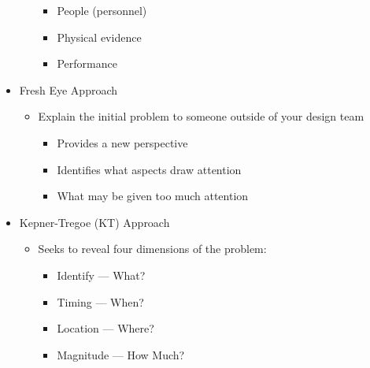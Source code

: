 \begin{itemize}
\begin{itemize}
\begin{itemize}
          \item People (personnel)

          \item Physical evidence

          \item Performance
            
        \end{itemize}

    \end{itemize}

  \item Fresh Eye Approach

    \begin{itemize}

      \item Explain the initial problem to someone outside of your design team

        \begin{itemize}

          \item Provides a new perspective

          \item Identifies what aspects draw attention

          \item What may be given too much attention

        \end{itemize}
        
    \end{itemize}

  \item Kepner-Tregoe (KT) Approach

    \begin{itemize}

      \item Seeks to reveal four dimensions of the problem:

        \begin{itemize}

          \item Identify — What?

          \item Timing — When?

          \item Location — Where?

          \item Magnitude — How Much?

        \end{itemize}


\end{itemize}
\end{itemize}
